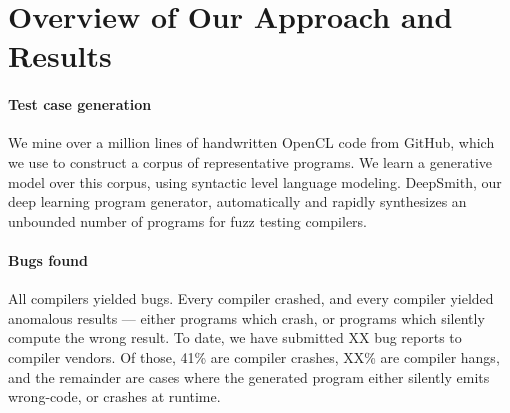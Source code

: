 \section{Overview of Our Approach and Results}\label{sec:overview}


\paragraph{Test case generation} We mine over a million lines of handwritten OpenCL code from GitHub, which we use to construct a corpus of representative programs. We learn a generative model over this corpus, using syntactic level language modeling. DeepSmith, our deep learning program generator, automatically and rapidly synthesizes an unbounded number of programs for fuzz testing compilers.


\paragraph{Bugs found} All compilers yielded bugs. Every compiler crashed, and every compiler yielded anomalous results --- either programs which crash, or programs which silently compute the wrong result. To date, we have submitted XX bug reports to compiler vendors. Of those, 41\% are compiler crashes, XX\% are compiler hangs, and the remainder are cases where the generated program either silently emits wrong-code, or crashes at runtime. 